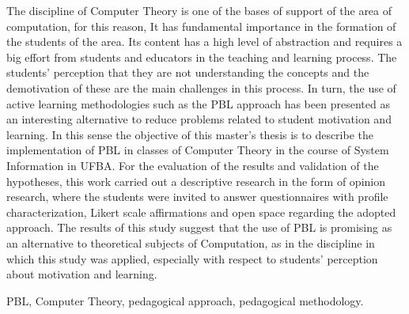 \abstract
The discipline of Computer Theory is one of the bases of support
of the area of computation, for this reason, It has fundamental
importance in the formation of the students of the area.
Its content has a high level of abstraction and requires a
big effort from students and educators in the teaching and
learning process.
The students' perception that they are not understanding the
concepts and the demotivation of these are the main challenges
in this process.
In turn, the use of active learning methodologies such as
the \ac{PBL} approach has been presented as an interesting
alternative to reduce problems related to student motivation
and learning.
In this sense the objective of this master's thesis is
to describe the implementation of \ac{PBL} in classes
of Computer Theory in the course of System
Information in \ac{UFBA}.
For the evaluation of the results and validation
of the hypotheses, this work carried out a descriptive
research in the form of opinion research, where the
students were invited to answer questionnaires with
profile characterization, Likert scale affirmations
and open space regarding the adopted approach.
The results of this study suggest that the use
of \ac{PBL} is promising as an alternative to theoretical
subjects of Computation, as in the discipline in which this
study was applied, especially with respect to
students' perception about motivation and learning.
\begin{keywords}
\ac{PBL}, Computer Theory, pedagogical approach,
pedagogical methodology.
\end{keywords}
